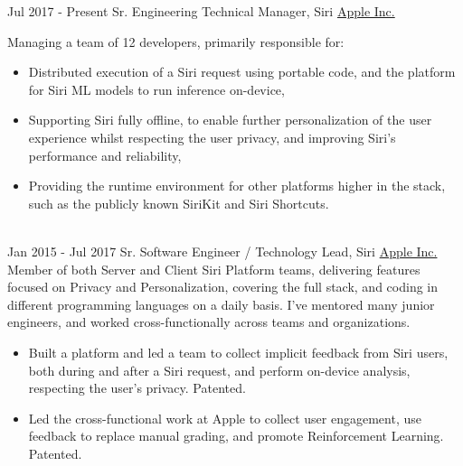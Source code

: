 \documentclass[letterpaper]{twentysecondcv} %
\begin{document}
\makeprofile %


\vspace{0.3cm}

\begin{twenty} %
    \twentyitem
        {Jul 2017 -}
        {Present}
        {Sr. Engineering Technical Manager, Siri}
        {\href{http://www.apple.com}{Apple Inc.}}
        {Managing a team of 12 developers, primarily responsible for:
        {\begin{itemize}
        \itemsep0em
        \item Distributed execution of a Siri request using portable code, and the platform for Siri ML models to run inference on-device,
        \item Supporting Siri fully offline, to enable further personalization of the user experience whilst respecting the user privacy, and improving Siri's performance and reliability,
        \item Providing the runtime environment for other platforms higher in the stack, such as the publicly known SiriKit and Siri Shortcuts.
        \end{itemize}}
        }
        {}
    \\
    \twentyitem
        {Jan 2015 -}
        {Jul 2017}
        {Sr. Software Engineer / Technology Lead, Siri}
        {\href{http://www.apple.com}{Apple Inc.}}
        {Member of both Server and Client Siri Platform teams, delivering features focused on Privacy and Personalization, covering the full stack, and coding in different programming languages on a daily basis. I've mentored many junior engineers, and worked cross-functionally across teams and organizations.}
        {
        {\begin{itemize}
        \item Built a platform and led a team to collect implicit feedback from Siri users, both during and after a Siri request, and perform on-device analysis, respecting the user’s privacy. Patented.
        \item Led the cross-functional work at Apple to collect user engagement, use feedback to replace manual grading, and promote Reinforcement Learning. Patented.

\end{itemize}}}
\end{twenty}
\end{document}
